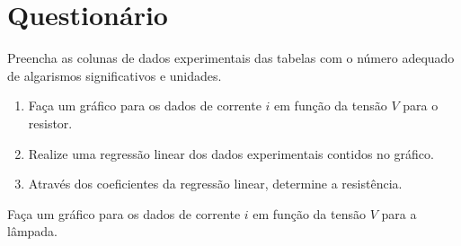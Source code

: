 \begin{fullwidth}
\noindent{}
\vspace{5mm}

\noindent{}

\noindent{}

\noindent{}

\noindent{}

\noindent{}
\end{fullwidth}

\vspace{5mm}

\section{Questionário}

\begin{question}[type={exam}]{2}
Preencha as colunas de dados experimentais das tabelas com o número adequado de algarismos significativos e unidades.
\end{question}

\begin{question}[type={exam}]{4}
\begin{enumerate}[label=\roman*.]
\item Faça um gráfico para os dados de corrente $i$ em função da tensão $V$ para o resistor.
\item Realize uma regressão linear dos dados experimentais contidos no gráfico.
\item Através dos coeficientes da regressão linear, determine a resistência.
\end{enumerate}
\end{question}

\begin{question}[type={exam}]{2}
Faça um gráfico para os dados de corrente $i$ em função da tensão $V$ para a lâmpada.
\end{question}



